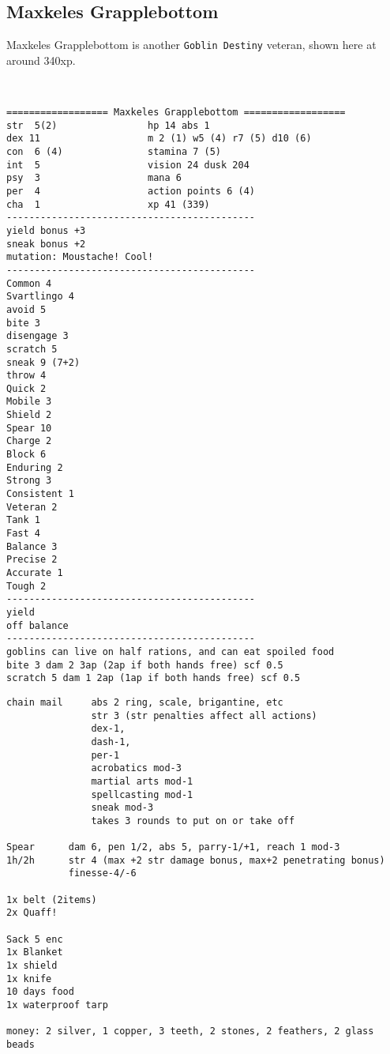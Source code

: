 \clearpage
\begin{samepage}
\subsection*{Maxkeles Grapplebottom}
\noindent Maxkeles Grapplebottom is another \texttt{Goblin Destiny} veteran, shown here at around 340xp.

\

\small \begin{verbatim}
================== Maxkeles Grapplebottom ==================
str  5(2)                hp 14 abs 1
dex 11                   m 2 (1) w5 (4) r7 (5) d10 (6)
con  6 (4)               stamina 7 (5)
int  5                   vision 24 dusk 204
psy  3                   mana 6
per  4                   action points 6 (4)
cha  1                   xp 41 (339)
--------------------------------------------
yield bonus +3
sneak bonus +2
mutation: Moustache! Cool!
--------------------------------------------
Common 4
Svartlingo 4
avoid 5
bite 3
disengage 3
scratch 5
sneak 9 (7+2)
throw 4
Quick 2
Mobile 3
Shield 2
Spear 10
Charge 2
Block 6
Enduring 2
Strong 3
Consistent 1
Veteran 2
Tank 1
Fast 4
Balance 3
Precise 2
Accurate 1
Tough 2
--------------------------------------------
yield
off balance
--------------------------------------------
goblins can live on half rations, and can eat spoiled food
bite 3 dam 2 3ap (2ap if both hands free) scf 0.5
scratch 5 dam 1 2ap (1ap if both hands free) scf 0.5
\end{verbatim} \end{samepage} \clearpage \begin{samepage} \begin{verbatim}
chain mail     abs 2 ring, scale, brigantine, etc
               str 3 (str penalties affect all actions)
               dex-1,
               dash-1,
               per-1
               acrobatics mod-3
               martial arts mod-1
               spellcasting mod-1
               sneak mod-3
               takes 3 rounds to put on or take off

Spear      dam 6, pen 1/2, abs 5, parry-1/+1, reach 1 mod-3
1h/2h      str 4 (max +2 str damage bonus, max+2 penetrating bonus)
           finesse-4/-6

1x belt (2items)
2x Quaff!

Sack 5 enc
1x Blanket
1x shield
1x knife
10 days food
1x waterproof tarp

money: 2 silver, 1 copper, 3 teeth, 2 stones, 2 feathers, 2 glass beads
\end{verbatim} \end{samepage} \normalsize








